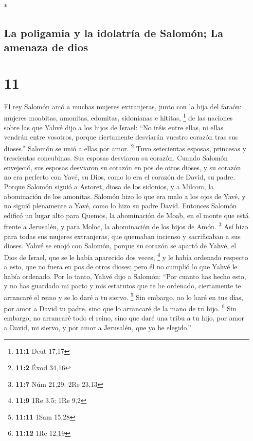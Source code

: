 \begin{paracol}{2}
\begin{otherlanguage}{english}
\end{otherlanguage}

\switchcolumn[0]*

\hypertarget{la-poligamia-y-la-idolatruxeda-de-salomuxf3n-la-amenaza-de-dios}{%
\subsection{La poligamia y la idolatría de Salomón; La amenaza de
dios}\label{la-poligamia-y-la-idolatruxeda-de-salomuxf3n-la-amenaza-de-dios}}

\hypertarget{section-20}{%
\section{11}\label{section-20}}

 El rey Salomón amó a muchas mujeres extranjeras, junto
con la hija del faraón: mujeres moabitas, amonitas, edomitas, sidonianas
e hititas, \footnote{\textbf{11:1} Deut 17,17}  de las
naciones sobre las que Yahvé dijo a los hijos de Israel: ``No iréis
entre ellas, ni ellas vendrán entre vosotros, porque ciertamente
desviarán vuestro corazón tras sus dioses.'' Salomón se unió a ellas por
amor. \footnote{\textbf{11:2} Éxod 34,16}  Tuvo
setecientas esposas, princesas y trescientas concubinas. Sus esposas
desviaron su corazón.  Cuando Salomón envejeció, sus
esposas desviaron su corazón en pos de otros dioses, y su corazón no era
perfecto con Yavé, su Dios, como lo era el corazón de David, su padre.
 Porque Salomón siguió a Astoret, diosa de los sidonios, y
a Milcom, la abominación de los amonitas.  Salomón hizo lo
que era malo a los ojos de Yavé, y no siguió plenamente a Yavé, como lo
hizo su padre David.  Entonces Salomón edificó un lugar
alto para Quemos, la abominación de Moab, en el monte que está frente a
Jerusalén, y para Moloc, la abominación de los hijos de Amón.
\footnote{\textbf{11:7} Núm 21,29; 2Re 23,13}  Así hizo
para todas sus mujeres extranjeras, que quemaban incienso y sacrificaban
a sus dioses.  Yahvé se enojó con Salomón, porque su
corazón se apartó de Yahvé, el Dios de Israel, que se le había aparecido
dos veces, \footnote{\textbf{11:9} 1Re 3,5; 1Re 9,2}  y
le había ordenado respecto a esto, que no fuera en pos de otros dioses;
pero él no cumplió lo que Yahvé le había ordenado.  Por
lo tanto, Yahvé dijo a Salomón: ``Por cuanto has hecho esto, y no has
guardado mi pacto y mis estatutos que te he ordenado, ciertamente te
arrancaré el reino y se lo daré a tu siervo. \footnote{\textbf{11:11}
  1Sam 15,28}  Sin embargo, no lo haré en tus días, por
amor a David tu padre, sino que lo arrancaré de la mano de tu hijo.
\footnote{\textbf{11:12} 1Re 12,19}  Sin embargo, no
arrancaré todo el reino, sino que daré una tribu a tu hijo, por amor a
David, mi siervo, y por amor a Jerusalén, que yo he elegido.''


\end{paracol}
